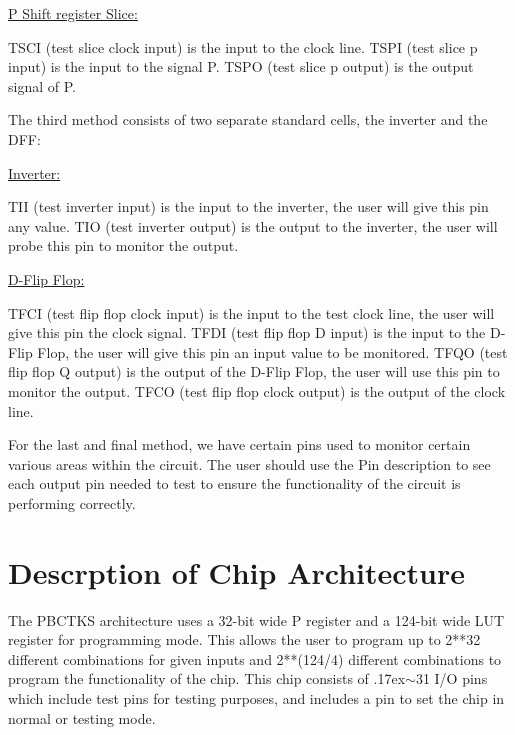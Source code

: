 \documentclass[a4paper]{article}
\newcommand{\tildep}{\raise.17ex\hbox{$\scriptstyle\sim$}}
\begin{document}
    \underline{P Shift register Slice:}

    TSCI (test slice clock input) is the input to the clock line. \newline
    TSPI (test slice p input) is the input to the signal P. \newline
    TSPO (test slice p output) is the output signal of P.

    The third method consists of two separate standard cells, the inverter and the DFF:

    \underline{Inverter:}

    TII (test inverter input) is the input to the inverter, the user will give this pin any value. \newline
    TIO (test inverter output) is the output to the inverter, the user will probe this pin to monitor the output.

    \underline{D-Flip Flop:}

    TFCI (test flip flop clock input) is the input to the test clock line, the user will give this pin the clock signal. \newline
    TFDI (test flip flop D input) is the input to the D-Flip Flop, the user will give this pin an input value to be monitored. \newline
    TFQO (test flip flop Q output) is the output of the D-Flip Flop, the user will use this pin to monitor the output. \newline
    TFCO (test flip flop clock output) is the output of the clock line.

    For the last and final method, we have certain pins used to monitor certain various areas within the circuit. The user should
    use the Pin description to see each output pin needed to test to ensure the functionality of the circuit is performing correctly.

\section{\textbf{Descrption of Chip Architecture}}
    The PBCTKS architecture uses a 32-bit wide P register and a 124-bit wide LUT register for programming
    mode. This allows the user to program up to 2**32 different combinations for given inputs and 2**(124/4)
    different combinations to program the functionality of the chip. This chip consists of \tildep 31 I/O pins
    which include test pins for testing purposes, and includes a pin to set the chip in normal or testing mode.

\end{document}
